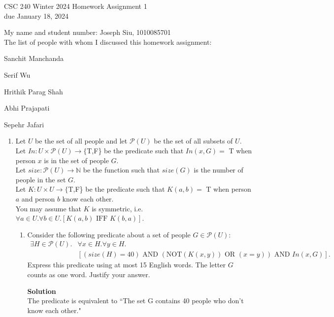 \documentclass[12pt]{article}
\newcommand{\nnot}{\mathrm{NOT}}
\newcommand{\aand}{\,\,\mathrm{AND}\,\,}
\newcommand{\oor}{\,\,\mathrm{OR}\,\,}
\newcommand{\iif}{\,\,\mathrm{IFF}\,\,}
\newcommand{\nats}{\mathbb{N}}
\begin{document}
\begin{center}
{\Large CSC 240 Winter 2024 Homework Assignment 1}\\
due January 18, 2024
\end{center}

My name and student number: Joseph Siu, 1010085701\\
The list of people with whom I discussed this homework assignment:

Sanchit Manchanda

Serif Wu

Hrithik Parag Shah

Abhi Prajapati

Sepehr Jafari


\begin{enumerate}
\item
Let $U$ be the set of all people and let $\mathcal{P}(U)$ be the set of all subsets of $U$.\\
Let $In: U \times \mathcal{P}(U)  \rightarrow \{$T,F\} be the predicate such that 
$In(x,G) = $ T when person $x$ is in the set of people $G$.\\
Let $size:\mathcal{P}(U) \rightarrow \nats$ be the function 
such that $size(G)$ is the number of people in the set $G$.\\
Let $K: U \times U \to \{$T,F\} be the predicate such that 
$K(a,b) =$ T when person $a$ and person $b$ know each other.\\
You may assume that $K$ is symmetric, i.e.~$\forall a \in U. \forall b \in U. [K(a,b) \iif  K(b,a)]$.

\begin{enumerate}
\item
Consider the following predicate about a set of people $G \in \mathcal{P}(U)$:
\begin{align*}
\exists H \in \mathcal{P}(U). & \forall x \in H. \forall y \in H.\\
& [(size(H)= 40)  \aand  (\nnot(K(x,y)) \oor (x=y)) \aand In(x , G)].
 \end{align*}
Express this predicate using at most 15 English words. The letter $G$ counts as one word.
Justify your answer. 
    
\vspace{.25in}\textbf{Solution}\vspace{.10in}\\

The predicate is equivalent to ``The set G contains 40 people who don't know each other."


\end{enumerate}
\end{enumerate}
\end{document}
